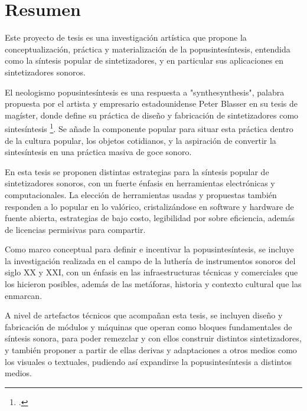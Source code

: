 \documentclass[../proyecto.tex]{subfiles}
\begin{document}
\section{Resumen}

Este proyecto de tesis es una investigación artística que propone la conceptualización, práctica y materialización de la popusintesíntesis, entendida como la síntesis popular de sintetizadores, y en particular sus aplicaciones en sintetizadores sonoros.

El neologismo popusintesíntesis es una respuesta a "synthesynthesis", palabra propuesta por el artista y empresario estadounidense Peter Blasser en su tesis de magíster, donde define su práctica de diseño y fabricación de sintetizadores como sintesíntesis \footcite{blasser_stores_2005}. Se añade la componente popular para situar esta práctica dentro de la cultura popular, los objetos cotidianos, y la aspiración de convertir la sintesíntesis en una práctica masiva de goce sonoro.

En esta tesis se proponen distintas estrategias para la síntesis popular de sintetizadores sonoros, con un fuerte énfasis en herramientas electrónicas y computacionales. La elección de herramientas usadas y propuestas también responden a lo popular en lo valórico, cristalizándose en software y hardware de fuente abierta, estrategias de bajo costo, legibilidad por sobre eficiencia, además de licencias permisivas para compartir.

Como marco conceptual para definir e incentivar la popusintesíntesis, se incluye la investigación realizada en el campo de la luthería de instrumentos sonoros del siglo XX y XXI, con un énfasis en las infraestructuras técnicas y comerciales que los hicieron posibles, además de las metáforas, historia y contexto cultural que las enmarcan.

A nivel de artefactos técnicos que acompañan esta tesis, se incluyen diseño y fabricación de módulos y máquinas que operan como bloques fundamentales de síntesis sonora, para poder remezclar y con ellos construir distintos sintetizadores, y también proponer a partir de ellas derivas y adaptaciones a otros medios como los visuales o textuales, pudiendo así expandirse la popusintesíntesis a distintos medios.

\end{document}
